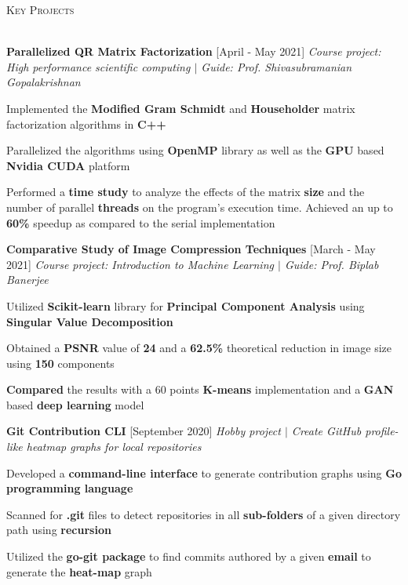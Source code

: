 \documentclass[11pt]{article}
\renewcommand{\section}[1]{
    \textsc{\Large{#1}}
    \vspace*{-10pt} \\ \hspace*{-5pt} 
    \hrulefill \\
    \vspace*{-15pt}
}
\newcommand{\smallbullet}{
    \tiny$\bullet$
}
\newcommand{\bigblock}[3]{
    {
        \vspace*{-5pt}
        \hspace*{-8pt} \textbf{#1} \hfill #2 \newline
        \textit{#3}
        \vspace*{-5pt}
    }
}
\newenvironment{bullet-list-minor}{
    \begin{list}{
        \smallbullet
    }{
        \setlength\leftmargin{15pt}\topsep 0pt \itemsep -6pt
    }
} {
    \end{list}
}
\begin{document}

    \section{Key Projects}

    \bigblock{
        Parallelized QR Matrix Factorization
    }{
        [April - May 2021]
    }{
        Course project: High performance scientific computing \(|\) Guide: Prof. Shivasubramanian Gopalakrishnan
    }
	\begin{bullet-list-minor}
        \item Implemented the \textbf{Modified Gram Schmidt} and \textbf{Householder} matrix factorization algorithms in \textbf{C++}
        \item Parallelized the algorithms using \textbf{OpenMP} library as well as the \textbf{GPU} based \textbf{Nvidia CUDA} platform
        \item Performed a \textbf{time study} to analyze the effects of the matrix \textbf{size} and the number of parallel \textbf{threads} on
        the program's execution time. Achieved an up to \textbf{60\%} speedup as compared to the serial implementation
    \end{bullet-list-minor}
    

    \bigblock{
        Comparative Study of Image Compression Techniques
    }{
        [March - May 2021]
    }{
        Course project: Introduction to Machine Learning \(|\) Guide: Prof. Biplab Banerjee
    }
	\begin{bullet-list-minor}
        \item Utilized \textbf{Scikit-learn} library for \textbf{Principal Component Analysis}
        using \textbf{Singular Value Decomposition}
        \item Obtained a \textbf{PSNR} value of \textbf{24} and a \textbf{62.5\%} theoretical reduction in image size using \textbf{150} components 
        \item \textbf{Compared} the results with a 60 points \textbf{K-means} implementation and a \textbf{GAN} based \textbf{deep learning} model
    \end{bullet-list-minor}

    \bigblock{
        Git Contribution CLI
    }{
        [September 2020]
    }{
        Hobby project \(|\) Create GitHub profile-like heatmap graphs for local repositories
    }
	\begin{bullet-list-minor}
        \item Developed a \textbf{command-line interface} to generate contribution graphs using \textbf{Go programming language}
        \item Scanned for \textbf{.git} files to detect repositories in all \textbf{sub-folders} of a given directory path using \textbf{recursion}
        \item Utilized the \textbf{go-git package} to find commits authored by a given \textbf{email} to generate the \textbf{heat-map} graph
    \end{bullet-list-minor}
\end{document}
